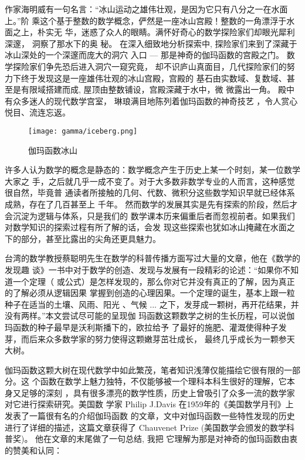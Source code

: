 {作家海明威有一句名言：“冰山运动之雄伟壮观，是因为它只有八分之一在水面上。”阶
乘这个基于整数的数学概念，俨然是一座冰山宫殿！整数的一角漂浮于水面之上，朴实无
华，迷惑了众人的眼睛。满怀好奇心的数学探险家们却眼光犀利深邃， 洞察了那水下的奥
秘。 在深入细致地分析探索中, 探险家们来到了深藏于冰山深处的一个深邃而庞大的洞穴
入口 --- 那是神奇的伽玛函数的宫殿之门。 数学探险家们争先恐后进入洞穴一窥究竟，
却不识庐山真面目，几代探险家们的努力下终于发现这是一座雄伟壮观的冰山宫殿，宫殿的
基石由实数域、复数域、甚至是有限域搭建而成, 屋顶由整数铺设，宫殿深藏于水中，微
微露出一角。 殿中有众多迷人的现代数学宫室， 琳琅满目地陈列着伽玛函数的神奇技艺
，令人赏心悦目、流连忘返。 

\begin{figure}[t]
\centering
\texttt{[image: gamma/iceberg.png]}
\caption{伽玛函数冰山}
\end{figure}

许多人认为数学的概念是静态的：数学概念产生于历史上某一个时刻，某一位数学大家之
手，之后就几乎一成不变了。对于大多数非数学专业的人而言，这种感觉很自然，毕竟普
通读者所接触的几何、代数、微积分这些数学知识早就已经体系成熟，存在了几百甚至上
千年。 然而数学的发展其实是先有探索的阶段，然后才会沉淀为逻辑与体系，只是我们的
数学课本历来偏重后者而忽视前者。如果我们对数学知识的探索过程有所了解的话，会发
现这些探索也犹如冰山掩藏在水面之下的部分，甚至比露出的尖角还更具魅力。 

台湾的数学教授蔡聪明先生在数学的科普传播方面写过大量的文章，他在《数学的发现趣
谈》一书中对于数学的创造、发现与发展有一段精彩的论述：“如果你不知道一个定理（
或公式）是怎样发现的，那么你对它并没有真正的了解，因为真正的了解必须从逻辑因果
掌握到创造的心理因果。一个定理的诞生，基本上跟一粒种子在适当的土壤、风雨、阳光
、气候 ... 之下，发芽成一颗树，再开花结果，并没有两样。”本文尝试尽可能的呈现伽
玛函数这颗数学之树的生长历程，可以说伽玛函数的种子最早是沃利斯播下的，欧拉给予
了最好的施肥、灌溉使得种子发芽，而后来众多数学家的努力使得这颗嫩芽茁壮成长，
最终几乎成长为一颗参天大树。

伽玛函数这颗大树在现代数学中如此繁茂，笔者知识浅薄仅能描绘它很有限的一部分。这
个函数在数学上魅力独特，不仅能够被一个理科本科生很好的理解，它本身又足够的深刻
，具有很多漂亮的数学性质，历史上曾吸引了众多一流的数学家对它进行探索研究。美国数
学家 Philip J.Davis 在1959年的《美国数学月刊》上发表了一篇很有名的介绍伽玛函数
的文章，文中对伽玛函数一些特性发现的历史进行了详细的描述，这篇文章获得了
Chauvenet Prize (美国数学会颁发的数学科普奖)。 他在文章的末尾做了一句总结, 我把
它理解为那是对神奇的伽玛函数由衷的赞美和认同：

}
